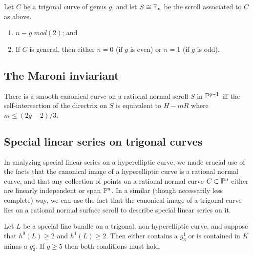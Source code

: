 \begin{lemma}
Let $C$ be a trigonal curve of genus $g$, and let $S \cong \FF_n$ be the scroll associated to $C$ as above. 
\begin{enumerate}
\item $n \equiv g \; mod (2)$; and
\item If $C$ is general, then  either  $n=0$ (if $g$ is even) or $n=1$ (if $g$ is odd).
\end{enumerate}\end{lemma}

\subsection{The Maroni inviariant}

\begin{theorem}
 There is a smooth canonical curve on a rational normal scroll $S$ in $\PP^{g-1}$ iff the self-intersection of the directrix on $S$ is equivalent to 
$H-mR$ where $m\leq (2g-2)/3$.
\end{theorem}

\subsection{Special linear series on trigonal curves}

In analyzing special linear series on a hyperelliptic curve, we made crucial use of the facts that the canonical image of a hyperelliptic curve is a rational normal curve, and that any collection of points on a rational normal curve $C \subset \PP^n$ either are linearly independent or span $\PP^n$. In a similar (though necessarily less complete) way, we can use the fact that the canonical image of a trigonal curve lies on a rational normal surface scroll to describe special linear series on it.

\begin{theorem}
Let $L$ be a special line bundle on a trigonal, non-hyperelliptic curve, and suppose that $h^0(L) \geq 2$ and $h^1(L)\geq 2$.  Then either contains a $g^1_3$ or is contained in $K$ minus a $g^1_3$. If $g\geq 5$ then both conditions must hold.
\end{theorem}



